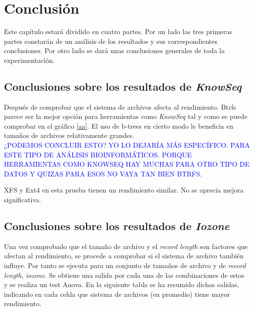 

\cleardoublepage
\clearpage{}

\chapter[Conclusión]{Conclusión}
Este capítulo estará dividido en cuatro partes. Por un lado las tres primeras partes constarán de un análisis de los resultados y sus correspondientes conclusiones. Por otro lado se dará unas conclusiones generales de toda la experimentación.

\section{Conclusiones sobre los resultados de \textit{KnowSeq}}
Después de comprobar que el sistema de archivos afecta al rendimiento. Btrfs parece ser la mejor opción para herramientas como \textit{KnowSeq} tal y como se puede comprobar en el gráfico  \ref{aa}. El uso de b-trees en cierto modo le beneficia en tamaños de archivos relativamente grandes.\\

\textcolor{blue}{¿PODEMOS CONCLUIR ESTO? YO LO DEJARÍA MÁS ESPECÍFICO. PARA ESTE TIPO DE ANÁLISIS BIOINFORMÁTICOS. PORQUE HERRAMIENTAS COMO KNOWSEQ HAY MUCHAS PARA OTRO TIPO DE DATOS Y QUIZAS PARA ESOS NO VAYA TAN BIEN BTRFS.}

XFS y Ext4 en esta prueba tienen un rendimiento similar. No se aprecia mejora significativa.


\section{Conclusiones sobre los resultados de \textit{Iozone}}
Una vez comprobado que el tamaño de archivo y el \textit{record length} son factores que afectan al rendimiento, se procede a comprobar si el sistema de archivo también influye. Por tanto se ejecuta para un conjunto de tamaños de archivo y de \textit{record length}, \textit{iozone}. Se obtiene una salida por cada una de las combinaciones de estos y se realiza un test Anova. En la siguiente tabla se ha resumido dichas salidas, indicando en cada celda que sistema de archivos (en promedio) tiene mayor rendimiento. 

